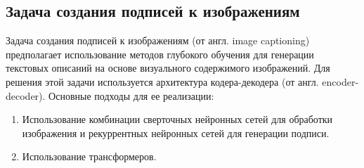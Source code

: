 \documentclass[a4paper,12pt]{extarticle}
\begin{document}
\subsection{Задача создания подписей к изображениям}\label{subsection:image-captioning}

Задача создания подписей к изображениям (от англ. image captioning) предполагает использование методов глубокого обучения для генерации текстовых описаний на основе визуального содержимого изображений. Для решения этой задачи используется архитектура кодера-декодера (от англ. encoder-decoder). Основные подходы для ее реализации:
\begin{enumerate}[label=\arabic*.]
	\item Использование комбинации сверточных нейронных сетей для обработки изображения и рекуррентных нейронных сетей для генерации подписи. 
	\item Использование трансформеров. 
\end{enumerate}
\end{document}
